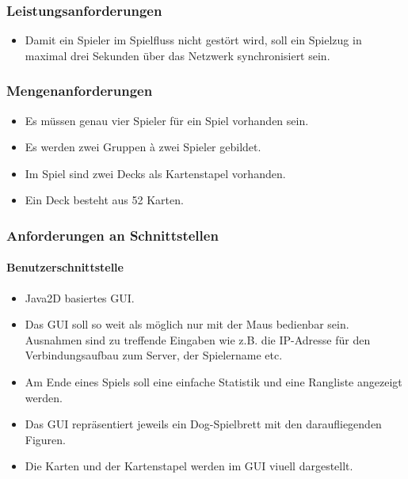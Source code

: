 \documentclass[a4paper,12pt,halfparskip,DIV14]{scrartcl}
\begin{document}
\subsubsection{Leistungsanforderungen}\label{ssub:leistungsanforderungen} %
\begin{itemize}
	\item Damit ein Spieler im Spielfluss nicht gestört wird, soll ein Spielzug in maximal drei Sekunden über das Netzwerk synchronisiert sein.
\end{itemize}
\subsubsection{Mengenanforderungen}\label{ssub:mengenanforderungen} %
\begin{itemize}
	\item Es müssen genau vier Spieler für ein Spiel vorhanden sein.
	\item Es werden zwei Gruppen à zwei Spieler gebildet.
	\item Im Spiel sind zwei Decks als Kartenstapel vorhanden.
	\item Ein Deck besteht aus 52 Karten.
\end{itemize}

\subsubsection{Anforderungen an Schnittstellen}\label{ssub:anforderungen_an_schnittstellen} %
\paragraph{Benutzerschnittstelle}\label{ssub:benutzerschnittstelle} %
\begin{itemize}
	\item Java2D basiertes GUI.
	\item Das GUI soll so weit als möglich nur mit der Maus bedienbar sein. Ausnahmen sind zu treffende Eingaben wie z.B. die IP-Adresse für den Verbindungsaufbau zum Server, der Spielername etc.
	\item Am Ende eines Spiels soll eine einfache Statistik und eine Rangliste angezeigt werden.
	\item Das GUI repräsentiert jeweils ein Dog-Spielbrett mit den daraufliegenden Figuren.
	\item Die Karten und der Kartenstapel werden im GUI viuell dargestellt.
\end{itemize}
\end{document}

